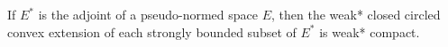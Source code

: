 If $E^*$ is the adjoint of a pseudo-normed space $E$, then the weak* closed circled convex extension of each strongly bounded subset of $E^*$ is weak* compact.
